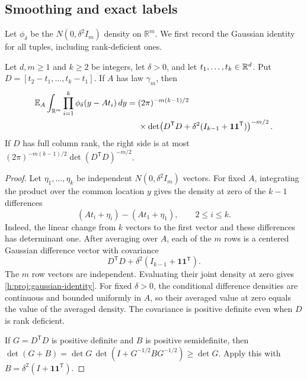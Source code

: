 \subsection{Smoothing and exact labels}

Let \(\phi_\delta\) be the \(N(0,\delta^2I_m)\) density on
\(\mathbb R^m\). We first record the Gaussian identity for all tuples,
including rank-deficient ones.

\begin{lemma}\label{h:proj:gaussian}
Let \(d,m\ge1\) and \(k\ge2\) be integers, let \(\delta>0\), and
let \(t_1,\ldots,t_k\in\mathbb R^d\). Put
\(D=[t_2-t_1,\ldots,t_k-t_1]\). If \(A\) has law \(\gamma_m\), then
\begin{equation}\label{h:proj:gaussian-identity}
\begin{split}
 \mathbb E_A\int_{\mathbb R^m}\prod_{i=1}^k\phi_\delta(y-At_i)\,dy
 ={}&(2\pi)^{-m(k-1)/2}\\
 &{}\times
 \det\!\left(D^{\mathsf T}D+
 \delta^2(I_{k-1}+\mathbf1\mathbf1^{\mathsf T})\right)^{-m/2}.
\end{split}
\end{equation}
If \(D\) has full column rank, the right side is at most
\((2\pi)^{-m(k-1)/2}\det(D^{\mathsf T}D)^{-m/2}\).
\end{lemma}

\begin{proof}
Let \(\eta_1,\ldots,\eta_k\) be independent
\(N(0,\delta^2I_m)\) vectors. For fixed \(A\), integrating the
product over the common location \(y\) gives the density at zero of
the \(k-1\) differences
\[
 (At_i+\eta_i)-(At_1+\eta_1),\qquad 2\le i\le k.
\]
Indeed, the linear change from \(k\) vectors to the first vector and
these differences has determinant one. After averaging over \(A\),
each of the \(m\) rows is a centered Gaussian difference vector with
covariance
\[
 D^{\mathsf T}D+\delta^2(I_{k-1}+\mathbf1\mathbf1^{\mathsf T}).
\]
The \(m\) row vectors are independent. Evaluating their joint density
at zero gives \eqref{h:proj:gaussian-identity}. For fixed
\(\delta>0\), the conditional difference densities are continuous
and bounded uniformly in \(A\), so their averaged value at zero
equals the value of the averaged density. The covariance is positive
definite even when \(D\) is rank deficient.

If \(G=D^{\mathsf T}D\) is positive definite and \(B\) is positive
semidefinite, then
\(\det(G+B)=\det G\,\det(I+G^{-1/2}BG^{-1/2})\ge\det G\).
Apply this with \(B=\delta^2(I+\mathbf1\mathbf1^{\mathsf T})\).
\end{proof}

